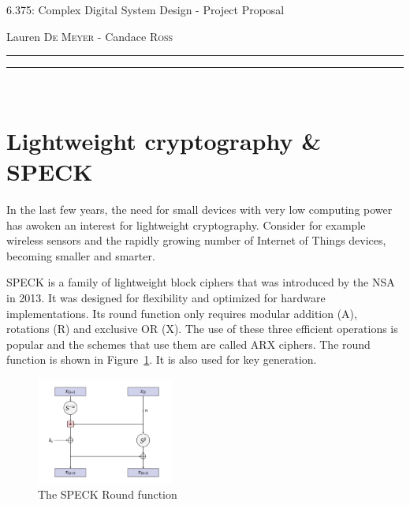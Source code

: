 \documentclass[letterpaper]{article}
\begin{document}
\begin{center}
{\Large 6.375: Complex Digital System Design - Project Proposal}\\[0.2\baselineskip] %
\vspace{-1em}
\begin{flushright}
Lauren \textsc{De Meyer} \quad - \quad Candace \textsc{Ross}
\end{flushright}
\vspace{-2em}
\rule{\textwidth}{0.4pt}\vspace*{-\baselineskip}\vspace{3.2pt} %
\rule{\textwidth}{1.6pt}\\[\baselineskip] %
\end{center}

\section{Lightweight cryptography \& SPECK}
In the last few years, the need for small devices with very low computing power has awoken an interest for lightweight cryptography. Consider for example wireless sensors and the rapidly growing number of Internet of Things devices, becoming smaller and smarter. 

SPECK \cite{speck} is a family of lightweight block ciphers that was introduced by the NSA in 2013. It was designed for flexibility and optimized for hardware implementations. Its round function only requires modular addition (A), rotations (R) and exclusive OR (X). The use of these three efficient operations is popular and the schemes that use them are called ARX ciphers. The round function is shown in Figure~\ref{fig:speck}. It is also used for key generation. \\

\begin{figure}[H]
\centering
\includegraphics[width=0.4\textwidth]{speck.png}
\caption{The SPECK Round function}
\label{fig:speck}
\end{figure}
\end{document}
